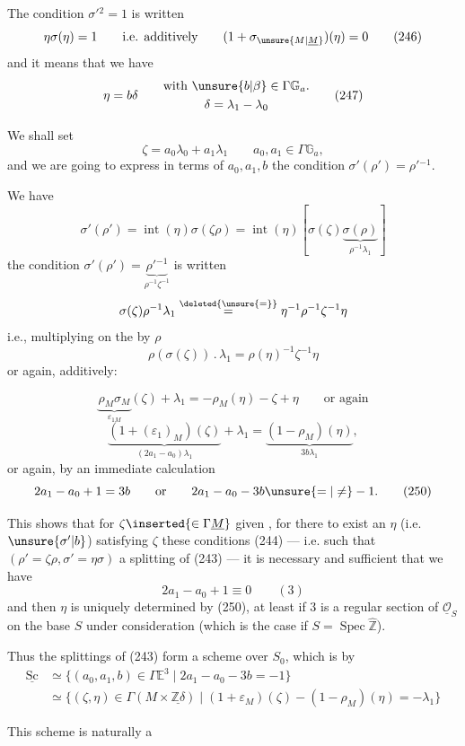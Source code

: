 The condition $\sigma'{}^2=1$ is written
\[
\eta\sigma(\eta)=1
\qquad\text{i.e. additively}\qquad
(1+\sigma_{\unsure{M|\underline M}})(\eta)=0
\tag{246}
\]
and it means that we have
\[
\eta=b\delta\qquad
\begin{gathered}
\text{with }\unsure{b|\beta}\in\Gamma\mathbb G_a.\\
\delta=\lambda_1-\lambda_0
\end{gathered}
\tag{247}
\]

We shall set
\[
\zeta=a_0\lambda_0+a_1\lambda_1
\qquad a_0,a_1\in\Gamma\mathbb G_a,
\tag{248}
\]
and we are going to express in terms of $a_0,a_1,b$ the condition
$\sigma'(\rho')=\rho'{}^{-1}$.

We have
\[
\sigma'(\rho')=\operatorname{int}(\eta)\sigma(\zeta\rho)
=\operatorname{int}(\eta)
\left[\sigma(\zeta)\underbrace{\sigma(\rho)}_{\rho^{-1}\lambda_1}\right]
\]
the condition
$\sigma'(\rho')=\underbrace{\rho'{}^{-1}}_{\rho^{-1}\zeta^{-1}}$
is written
\[
\sigma(\zeta)\rho^{-1}\lambda_1
\overset{\deleted{\unsure{=}}}{=}
\eta^{-1}\rho^{-1}\zeta^{-1}\eta
\]
i.e., multiplying on the  by $\rho$
\[
\rho(\sigma(\zeta))\mathbin{.}\lambda_1
=\rho(\eta)^{-1}\zeta^{-1}\eta
\]
or again, additively:



\[
\underbrace{\rho_M\sigma_M}_{\varepsilon_{1M}}(\zeta)+\lambda_1
=-\rho_M(\eta)-\zeta+\eta
\qquad\text{or again}
\]
\[
\underbrace{(1+(\varepsilon_1)_M)(\zeta)}_{(2a_1-a_0)\lambda_1}
+\lambda_1
=\underbrace{(1-\rho_M)(\eta)}_{3b\lambda_1},
\tag{249}
\]
or again, by an immediate calculation
\[
2a_1-a_0+1=3b
\qquad\text{or}\qquad
2a_1-a_0-3b\unsure{=|\ne}-1.
\tag{250}
\]

This shows that for $\zeta\inserted{\in\Gamma\underline M}$ given
, for there to exist an $\eta$
(i.e. $\unsure{\sigma'|b}$) satisfying  $\zeta$ these
conditions (244) --- i.e.  such that
$(\rho'=\zeta\rho,\sigma'=\eta\sigma)$  a splitting of
(243) --- it is necessary and sufficient that we have
\[
2a_1-a_0+1\equiv0\qquad(3)
\tag{251}
\]
and then $\eta$ is uniquely determined by (250), at least if $3$ is
a regular section of $\underline{\mathcal O}_S$ on the base $S$
under consideration (which is the case if $S=\operatorname{Spec}\widehat{\mathbb Z}$).

Thus the splittings of (243) form a scheme
 over $S_0$, which is
  by
\[
\begin{aligned}
\underline{\mathrm{Sc}}
&\simeq
\{(a_0,a_1,b)\in\Gamma\mathbb E^3
  \mid 2a_1-a_0-3b=-1\}\\
&\simeq
\{(\zeta,\eta)\in\Gamma(M\times\underline{\mathbb Z\delta})
  \mid(1+\varepsilon_{M})(\zeta)
       -(1-\rho_M)(\eta)=-\lambda_1\}
\end{aligned}
\tag{252}
\]

This scheme is naturally a

